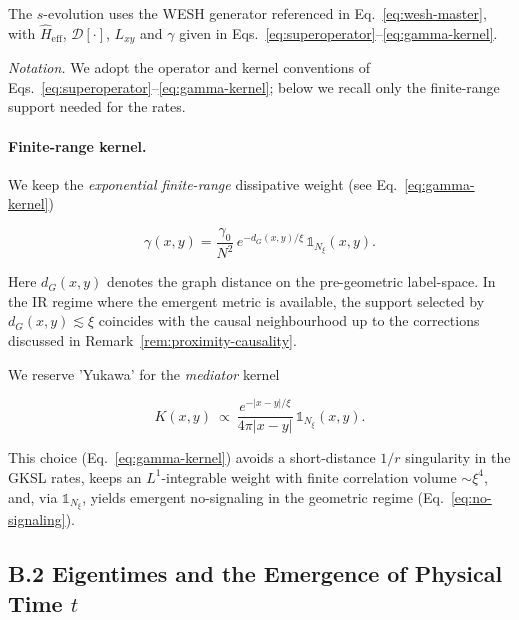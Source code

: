 \documentclass[12pt,a4paper]{article}
\newcommand{\eff}{\mathrm{eff}}
\numberwithin{equation}{section}
\begin{document}
\vspace{0.5cm}

\noindent The $s$-evolution uses the WESH generator referenced in Eq.~\eqref{eq:wesh-master}, with $\hat H_{\eff}$, $\mathcal D[\cdot]$, $L_{xy}$ and $\gamma$ given in Eqs.~\eqref{eq:superoperator}–\eqref{eq:gamma-kernel}.

\vspace{0.5cm}

\noindent\textit{Notation.} We adopt the operator and kernel conventions of Eqs.~\eqref{eq:superoperator}–\eqref{eq:gamma-kernel}; below we recall only the finite-range support needed for the rates.

\paragraph{Finite-range kernel.}
We keep the \emph{exponential finite-range} dissipative weight (see Eq.~\eqref{eq:gamma-kernel})

\vspace{0.5cm}

\[
\gamma(x,y)=\frac{\gamma_0}{N^2}\,e^{-d_G(x,y)/\xi}\,\mathbb{1}_{N_\xi}(x,y).
\]

\noindent Here $d_G(x,y)$ denotes the graph distance on the pre-geometric
label-space. In the IR regime where the emergent metric is available, the
support selected by $d_G(x,y)\lesssim \xi$ coincides with the causal
neighbourhood up to the corrections discussed in
Remark~\ref{rem:proximity-causality}.

\vspace{0.5cm}
\noindent We reserve 'Yukawa' for the \emph{mediator} kernel

\vspace{0.5cm}
\[
K(x,y)\ \propto\ \frac{e^{-|x-y|/\xi}}{4\pi |x-y|}\,\mathbb{1}_{N_\xi}(x,y).
\]

\vspace{0.5cm}

\noindent This choice (Eq.~\eqref{eq:gamma-kernel}) avoids a short-distance $1/r$ singularity in the GKSL rates, keeps an $L^1$-integrable weight with finite correlation volume $\sim\xi^4$, and, via $\mathbb{1}_{N_\xi}$, yields emergent no-signaling in the geometric regime (Eq.~\eqref{eq:no-signaling}). 

\vspace{0.8cm}

\subsection*{B.2 Eigentimes and the Emergence of Physical Time $t$}
\end{document}
